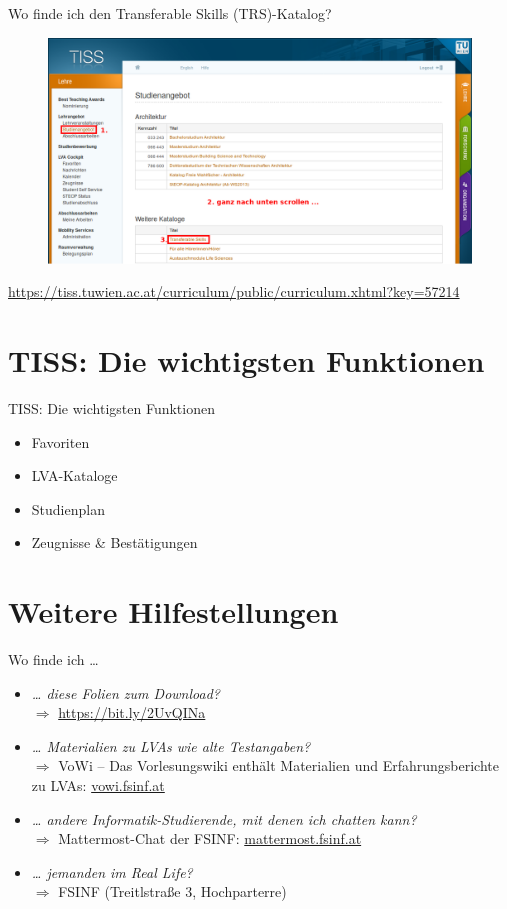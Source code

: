 \documentclass{beamer}
\begin{document}
\begin{frame}{Wo finde ich den Transferable Skills (TRS)-Katalog?}
    \begin{figure}[htp]
        \includegraphics[width=1.0\textwidth]{tiss_tfs.png}
    \end{figure}
     \url{https://tiss.tuwien.ac.at/curriculum/public/curriculum.xhtml?key=57214}
\end{frame}

\section{TISS: Die wichtigsten Funktionen}
\begin{frame}{TISS: Die wichtigsten Funktionen}
    \begin{itemize}
        \item Favoriten
        \item LVA-Kataloge
        \item Studienplan
        \item Zeugnisse \& Bestätigungen
    \end{itemize}
\end{frame}

\section{Weitere Hilfestellungen}
\begin{frame}{Wo finde ich \ldots}
    \begin{itemize}
        \item \textit{\ldots{} diese Folien zum Download?} \\
              $\Rightarrow$ \url{https://bit.ly/2UvQINa}
        \item \textit{\ldots{} Materialien zu LVAs wie alte Testangaben?} \\
              $\Rightarrow$ VoWi -- Das Vorlesungswiki enthält Materialien und
              Erfahrungsberichte zu LVAs: \url{vowi.fsinf.at}
        \item \textit{\ldots{} andere Informatik-Studierende, mit denen ich
              chatten kann?} \\
              $\Rightarrow$ Mattermost-Chat der FSINF: \url{mattermost.fsinf.at}
        \item \textit{\ldots{} jemanden im Real Life?} \\
              $\Rightarrow$ FSINF (Treitlstraße 3, Hochparterre)
    \end{itemize}
\end{frame}
\end{document}
